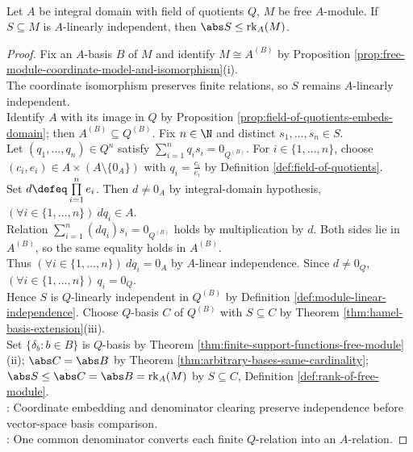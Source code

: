 \begin{theorem} \label{thm:independent-sets-bounded-by-free-rank-domain} \\
Let $A$ be integral domain with field of quotients $Q$, $M$ be free $A$-module. If $S\subseteq M$ is $A$-linearly independent, then $\abs S\leq\operatorname{rk}_A(M)$.
\begin{proof}
Fix an $A$-basis $B$ of $M$ and identify $M\cong A^{(B)}$ by Proposition \ref{prop:free-module-coordinate-model-and-isomorphism}(i).\\
The coordinate isomorphism preserves finite relations, so $S$ remains $A$-linearly independent.\\
Identify $A$ with its image in $Q$ by Proposition \ref{prop:field-of-quotients-embeds-domain}; then $A^{(B)}\subseteq Q^{(B)}$. Fix $n\in\N$ and distinct $s_1,\ldots,s_n\in S$.\\
Let $(q_1,\ldots,q_n)\in Q^n$ satisfy $\sum\limits_{i=1}^nq_is_i=0_{Q^{(B)}}$. For $i\in\{1,\ldots,n\}$, choose $(c_i,e_i)\in A\times(A\setminus\{0_A\})$ with $q_i=\frac{c_i}{e_i}$ by Definition \ref{def:field-of-quotients}.\\
Set $d\defeq\prod\limits_{i=1}^ne_i$. Then $d\neq0_A$ by integral-domain hypothesis, $(\forall i\in\{1,\ldots,n\})\ dq_i\in A$.\\
Relation $\sum\limits_{i=1}^n(dq_i)s_i=0_{Q^{(B)}}$ holds by multiplication by $d$. Both sides lie in $A^{(B)}$, so the same equality holds in $A^{(B)}$.\\
Thus $(\forall i\in\{1,\ldots,n\})\ dq_i=0_A$ by $A$-linear independence. Since $d\neq0_Q$, $(\forall i\in\{1,\ldots,n\})\ q_i=0_Q$.\\
Hence $S$ is $Q$-linearly independent in $Q^{(B)}$ by Definition \ref{def:module-linear-independence}. Choose $Q$-basis $C$ of $Q^{(B)}$ with $S\subseteq C$ by Theorem \ref{thm:hamel-basis-extension}(iii).\\
Set $\{\delta_b:b\in B\}$ is $Q$-basis by Theorem \ref{thm:finite-support-functions-free-module}(ii); $\abs C=\abs B$ by Theorem \ref{thm:arbitrary-bases-same-cardinality}; $\abs S\leq\abs C=\abs B=\operatorname{rk}_A(M)$ by $S\subseteq C$, Definition \ref{def:rank-of-free-module}.\\
: Coordinate embedding and denominator clearing preserve independence before vector-space basis comparison.\\
: One common denominator converts each finite $Q$-relation into an $A$-relation.
\end{proof}
\end{theorem}

